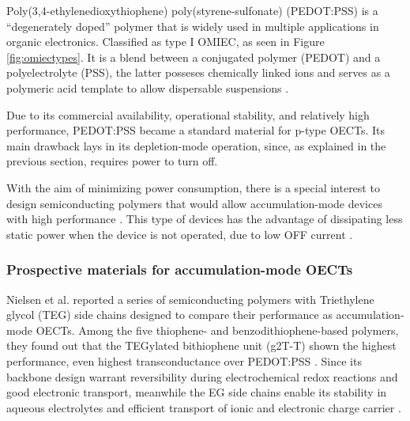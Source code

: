 Poly(3,4-ethylenedioxythiophene) poly(styrene-sulfonate) (PEDOT:PSS) is a ``degenerately doped''\cite{bernardsSteadyStateTransientBehavior2007} polymer that is widely used in multiple applications in organic electronics. Classified as type I OMIEC, as seen in Figure \ref{fig:omiectypes}. It is a blend between a conjugated polymer (PEDOT) and a polyelectrolyte (PSS), the latter posseses chemically linked ions and serves as a polymeric acid template to allow dispersable suspensions \cite{paulsenOrganicMixedIonic2020}.

Due to its commercial availability, operational stability, and relatively high performance, PEDOT:PSS became a standard material for p-type OECTs. Its main drawback lays in its depletion-mode operation, since, as explained in the previous section, requires power to turn off. 

With the aim of minimizing power consumption, there is a special interest to design semiconducting polymers that would allow accumulation-mode devices with high performance \cite{nielsenMolecularDesignSemiconducting2016}\cite{tanOrganicMixedIonic2022}\cite{inalBenchmarkingOrganicMixed2017}\cite{keeneEnhancementModePEDOTPSS2020}. This type of devices has the advantage of dissipating less static power when the device is not operated, due to low OFF current%
\cite{giovannittiEnergeticControlRedoxActive2020}.

\subsubsection{Prospective materials for accumulation-mode OECTs}

Nielsen et al. reported a series of semiconducting polymers with Triethylene glycol (TEG) side chains designed to compare their performance as accumulation-mode OECTs. Among the five thiophene- and benzodithiophene-based polymers, they found out that the TEGylated bithiophene unit (g2T-T) shown the highest performance, even highest transconductance over PEDOT:PSS \cite{nielsenMolecularDesignSemiconducting2016}. Since its backbone design warrant reversibility during electrochemical redox reactions and good electronic transport, meanwhile the EG side chains enable its stability in aqueous electrolytes and efficient transport of ionic and electronic charge carrier \cite{moiaDesignEvaluationConjugated2019}. 

